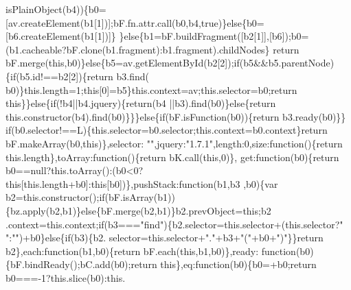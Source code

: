 \begin{DoxyCode}
      isPlainObject(b4))\{b0=[av.createElement(b1[1])];bF.fn.attr.call(b0,b4,\textcolor{keyword}{true})\}\textcolor{keywordflow}{else}\{b0=[b6.createElement(b1[1])]\}
      \}\textcolor{keywordflow}{else}\{b1=bF.buildFragment([b2[1]],[b6]);b0=(b1.cacheable?bF.clone(b1.fragment):b1.fragment).childNodes\}\textcolor{keywordflow}{
      return} bF.merge(\textcolor{keyword}{this},b0)\}\textcolor{keywordflow}{else}\{b5=av.getElementById(b2[2]);\textcolor{keywordflow}{if}(b5&&b5.parentNode)\{\textcolor{keywordflow}{if}(b5.id!==b2[2])\{\textcolor{keywordflow}{return} b3.find(
      b0)\}this.length=1;\textcolor{keyword}{this}[0]=b5\}this.context=av;this.selector=b0;\textcolor{keywordflow}{return} \textcolor{keyword}{this}\}\}\textcolor{keywordflow}{else}\{\textcolor{keywordflow}{if}(!b4||b4.jquery)\{\textcolor{keywordflow}{return}(b4
      ||b3).find(b0)\}\textcolor{keywordflow}{else}\{\textcolor{keywordflow}{return} this.constructor(b4).find(b0)\}\}\}\textcolor{keywordflow}{else}\{\textcolor{keywordflow}{if}(bF.isFunction(b0))\{\textcolor{keywordflow}{return} b3.ready(b0)\}\}\textcolor{keywordflow}{
      if}(b0.selector!==L)\{this.selector=b0.selector;this.context=b0.context\}\textcolor{keywordflow}{return} bF.makeArray(b0,\textcolor{keyword}{this})\},selector:\textcolor{stringliteral}{
      ""},jquery:\textcolor{stringliteral}{"1.7.1"},length:0,size:\textcolor{keyword}{function}()\{\textcolor{keywordflow}{return} this.length\},toArray:\textcolor{keyword}{function}()\{\textcolor{keywordflow}{return} bK.call(\textcolor{keyword}{this},0)\},\textcolor{keyword}{
      get}:\textcolor{keyword}{function}(b0)\{\textcolor{keywordflow}{return} b0==null?this.toArray():(b0<0?this[this.length+b0]:this[b0])\},pushStack:function(b1,b3
      ,b0)\{var b2=this.constructor();\textcolor{keywordflow}{if}(bF.isArray(b1))\{bz.apply(b2,b1)\}\textcolor{keywordflow}{else}\{bF.merge(b2,b1)\}b2.prevObject=\textcolor{keyword}{this};b2
      .context=this.context;\textcolor{keywordflow}{if}(b3===\textcolor{stringliteral}{"find"})\{b2.selector=this.selector+(this.selector?\textcolor{stringliteral}{" "}:\textcolor{stringliteral}{""})+b0\}\textcolor{keywordflow}{else}\{\textcolor{keywordflow}{if}(b3)\{b2.
      selector=this.selector+\textcolor{stringliteral}{"."}+b3+\textcolor{stringliteral}{"("}+b0+\textcolor{stringliteral}{")"}\}\}\textcolor{keywordflow}{return} b2\},each:\textcolor{keyword}{function}(b1,b0)\{\textcolor{keywordflow}{return} bF.each(\textcolor{keyword}{this},b1,b0)\},ready:\textcolor{keyword}{
      function}(b0)\{bF.bindReady();bC.add(b0);\textcolor{keywordflow}{return} \textcolor{keyword}{this}\},eq:\textcolor{keyword}{function}(b0)\{b0=+b0;\textcolor{keywordflow}{return} b0===-1?this.slice(b0):this.

\end{DoxyCode}
